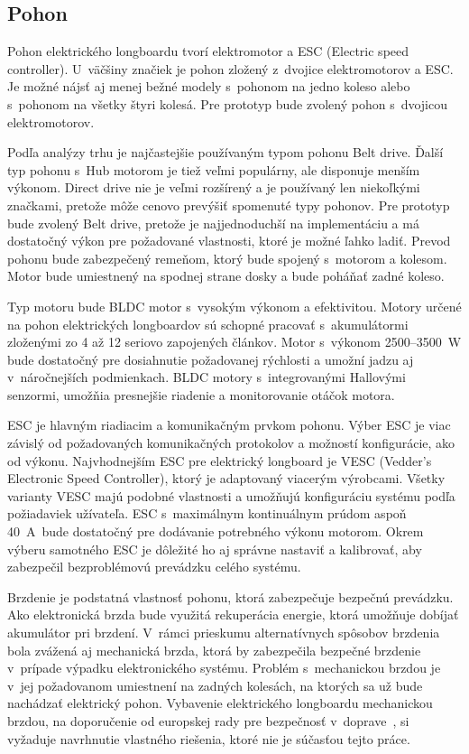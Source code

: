\subsection{Pohon}
Pohon elektrického longboardu tvorí elektromotor a ESC (Electric speed controller).
U~väčšiny značiek je pohon zložený z~dvojice elektromotorov a ESC.
Je možné nájsť aj menej bežné modely s~pohonom na jedno koleso alebo s~pohonom na všetky štyri kolesá.
Pre prototyp bude zvolený pohon s~dvojicou elektromotorov.

Podľa analýzy trhu je najčastejšie používaným typom pohonu Belt drive.
Ďalší typ pohonu s~Hub motorom je tiež veľmi populárny, ale disponuje menším výkonom.
Direct drive nie je veľmi rozšírený a je používaný len niekoľkými značkami, pretože môže cenovo prevýšiť spomenuté typy pohonov.
Pre prototyp bude zvolený Belt drive, pretože je najjednoduchší na implementáciu a má dostatočný výkon pre požadované vlastnosti, ktoré je možné ľahko ladiť.
Prevod pohonu bude zabezpečený remeňom, ktorý bude spojený s~motorom a kolesom.
Motor bude umiestnený na spodnej strane dosky a bude poháňať zadné koleso.

Typ motoru bude BLDC motor s~vysokým výkonom a efektivitou.
Motory určené na pohon elektrických longboardov sú schopné pracovať s~akumulátormi zloženými zo 4 až 12 seriovo zapojených článkov.
Motor s~výkonom 2500--3500~W bude dostatočný pre dosiahnutie požadovanej rýchlosti a umožní jadzu aj v~náročnejších podmienkach.
BLDC motory s~integrovanými Hallovými senzormi, umožňia presnejšie riadenie a monitorovanie otáčok motora.\cite{TorqueBoards}

\bigskip

ESC je hlavným riadiacim a komunikačným prvkom pohonu.
Výber ESC je viac závislý od požadovaných komunikačných protokolov a možností konfigurácie, ako od výkonu.
Najvhodnejším ESC pre elektrický longboard je VESC (Vedder's Electronic Speed Controller), ktorý je adaptovaný viacerým výrobcami.
Všetky varianty VESC majú podobné vlastnosti a umožňujú konfiguráciu systému podľa požiadaviek užívateľa.
ESC s~maximálnym kontinuálnym prúdom aspoň 40~A~bude dostatočný pre dodávanie potrebného výkonu motorom.
Okrem výberu samotného ESC je dôležité ho aj správne nastaviť a kalibrovať, aby zabezpečil bezproblémovú prevádzku celého systému.\cite{VESC}

\bigskip

Brzdenie je podstatná vlastnosť pohonu, ktorá zabezpečuje bezpečnú prevádzku.
Ako elektronická brzda bude využitá rekuperácia energie, ktorá umožňuje dobíjať akumulátor pri brzdení.
V~rámci prieskumu alternatívnych spôsobov brzdenia bola zvážená aj mechanická brzda, ktorá by zabezpečila bezpečné brzdenie v~prípade výpadku elektronického systému.
Problém s~mechanickou brzdou je v~jej požadovanom umiestnení na zadných kolesách, na ktorých sa už bude nachádzať elektrický pohon.
Vybavenie elektrického longboardu mechanickou brzdou, na doporučenie od europskej rady pre bezpečnosť v~doprave~\cite{CDV}, si vyžaduje navrhnutie vlastného riešenia, ktoré nie je súčasťou tejto práce.

